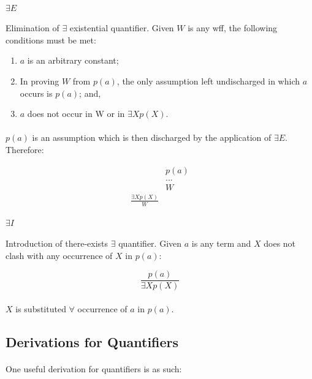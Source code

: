 \documentclass{article}
\theoremstyle{plain}
\theoremstyle{definition}
\begin{document}
\begin{multicols}{2}
\paragraph{$\exists E$} Elimination of $\exists$ existential quantifier. Given $W$ is any wff, the following conditions must be met:

\begin{enumerate}
\item $a$ is an arbitrary constant;
\item In proving $W$ from $p(a)$, the only assumption left undischarged in which $a$ occurs is $p(a)$; and,
\item $a$ does not occur in W or in $\exists X p(X)$.
\end{enumerate}

\paragraph{} $p(a)$ is an assumption which is then discharged by the application of $\exists E$. Therefore:

 \begin{align*}
 &p(a) \tag*{\tiny Assume}\\
 &...\\
 &W\\
 \frac{\exists X p(X)\tag*{\tiny Given}}{W}
\end{align*}

 \paragraph{$\exists I$} Introduction of there-exists $\exists$ quantifier. Given $a$ is any term and $X$ does not clash with any occurrence of $X$ in $p(a)$:

 \begin{equation*}
 \frac{p(a)}{\exists X p(X)}
\end{equation*}

\paragraph{} $X$ is substituted $\forall$ occurrence of $a$ in $p(a)$.

\subsection{Derivations for Quantifiers}

\paragraph{} One useful derivation for quantifiers is as such:


\end{multicols}
\end{document}
